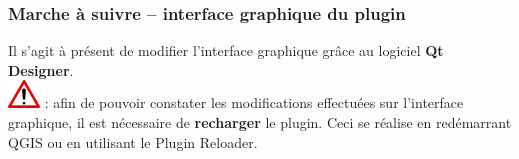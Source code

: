 \documentclass[11pt]{article}
\begin{document}
\newpage{}
\vspace*{-3.2em}
\subsubsection{Marche à suivre \--- interface graphique du plugin}
Il s'agit à présent de modifier l'interface graphique grâce au logiciel \og{}\textbf{Qt Designer}\fg{}. \\

\vspace*{-0.4em}
\includegraphics[scale=1]{warningt.png} \underline{}: afin de pouvoir constater les modifications effectuées sur l'interface graphique, il est nécessaire de \textbf{recharger} le plugin. Ceci se réalise en redémarrant QGIS ou en utilisant le \og{}Plugin Reloader\fg{}. 
\end{document}
